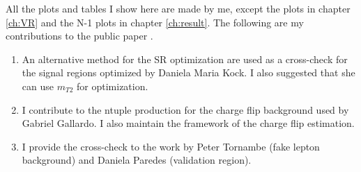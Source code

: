 All the plots and tables I show here are made by me, except the plots in chapter \ref{ch:VR} and the N-1 plots in chapter \ref{ch:result}.
The following are my contributions to the public paper \cite{Wh} \cite{WhSS}.
\begin{enumerate}
\item An alternative method for the SR optimization are used as a cross-check for the signal regions optimized by Daniela Maria Kock. I also suggested that she can use $m_{T2}$ for optimization.
\item I contribute to the ntuple production for the charge flip background used by Gabriel Gallardo. I also maintain the framework of the charge flip estimation.
\item I provide the cross-check to the work by Peter Tornambe (fake lepton background) and Daniela Paredes (validation region).
\end{enumerate}
